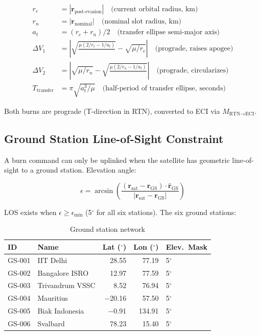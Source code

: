 \documentclass[12pt,a4paper]{article}
\begin{document}
\begin{align}
r_c &= |\mathbf{r}_{\text{post-evasion}}| \quad \text{(current orbital radius, km)} \\
r_n &= |\mathbf{r}_{\text{nominal}}| \quad \text{(nominal slot radius, km)} \\
a_t &= (r_c + r_n) / 2 \quad \text{(transfer ellipse semi-major axis)} \\
\Delta V_1 &= \left|\sqrt{\frac{\mu(2/r_c - 1/a_t)}{}} - \sqrt{\mu/r_c}\right| \quad \text{(prograde, raises apogee)} \\
\Delta V_2 &= \left|\sqrt{\mu/r_n} - \sqrt{\frac{\mu(2/r_n - 1/a_t)}{}}\right| \quad \text{(prograde, circularizes)} \\
T_{\text{transfer}} &= \pi\sqrt{a_t^3/\mu} \quad \text{(half-period of transfer ellipse, seconds)}
\end{align}

Both burns are prograde (T-direction in RTN), converted to ECI via $M_{\text{RTN}\rightarrow\text{ECI}}$.

\subsection{Ground Station Line-of-Sight Constraint}

A burn command can only be uplinked when the satellite has geometric line-of-sight to a ground station. Elevation angle:

\begin{equation}
\epsilon = \arcsin\!\left(\frac{(\mathbf{r}_{\text{sat}} - \mathbf{r}_{\text{GS}}) \cdot \hat{\mathbf{r}}_{\text{GS}}}{|\mathbf{r}_{\text{sat}} - \mathbf{r}_{\text{GS}}|}\right)
\end{equation}

LOS exists when $\epsilon \geq \epsilon_{\min}$ (5$^\circ$ for all six stations). The six ground stations:

\begin{table}[H]
\centering
\caption{Ground station network}
\begin{tabular}{llrrl}
\toprule
\textbf{ID} & \textbf{Name} & \textbf{Lat ($^\circ$)} & \textbf{Lon ($^\circ$)} & \textbf{Elev.\ Mask} \\
\midrule
GS-001 & IIT Delhi & 28.55 & 77.19 & 5$^\circ$ \\
GS-002 & Bangalore ISRO & 12.97 & 77.59 & 5$^\circ$ \\
GS-003 & Trivandrum VSSC & 8.52 & 76.94 & 5$^\circ$ \\
GS-004 & Mauritius & $-$20.16 & 57.50 & 5$^\circ$ \\
GS-005 & Biak Indonesia & $-$0.91 & 134.91 & 5$^\circ$ \\
GS-006 & Svalbard & 78.23 & 15.40 & 5$^\circ$ \\
\bottomrule
\end{tabular}
\end{table}
\end{document}
